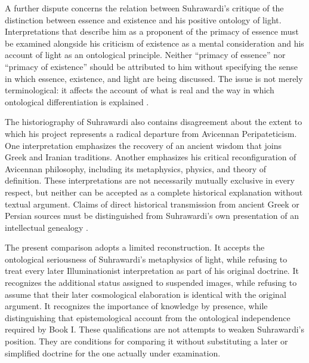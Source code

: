 \label{para:VS.B01.P01.C08.S14.SS03.P002}

A further dispute concerns the relation between Suhrawardi's
critique of the distinction between essence and existence
and his positive ontology of light. Interpretations that
describe him as a proponent of the primacy of essence must
be examined alongside his criticism of existence as a
mental consideration and his account of light as an
ontological principle. Neither ``primacy of essence'' nor
``primacy of existence'' should be attributed to him without
specifying the sense in which essence, existence, and light
are being discussed. The issue is not merely terminological:
it affects the account of what is real and the way in which
ontological differentiation is explained
\citep{MarcotteSuhrawardiSEP2019,WalbridgeLeavenAncients2000}.

\label{para:VS.B01.P01.C08.S14.SS03.P003}

The historiography of Suhrawardi also contains disagreement
about the extent to which his project represents a radical
departure from Avicennan Peripateticism. One interpretation
emphasizes the recovery of an ancient wisdom that joins Greek
and Iranian traditions. Another emphasizes his critical
reconfiguration of Avicennan philosophy, including its
metaphysics, physics, and theory of definition. These
interpretations are not necessarily mutually exclusive in
every respect, but neither can be accepted as a complete
historical explanation without textual argument. Claims of
direct historical transmission from ancient Greek or Persian
sources must be distinguished from Suhrawardi's own
presentation of an intellectual genealogy
\citep{WalbridgeLeavenAncients2000,ZiaiKnowledgeIllumination1990}.

\label{para:VS.B01.P01.C08.S14.SS03.P004}

The present comparison adopts a limited reconstruction.
It accepts the ontological seriousness of Suhrawardi's
metaphysics of light, while refusing to treat every later
Illuminationist interpretation as part of his original
doctrine. It recognizes the additional status assigned to
suspended images, while refusing to assume that their later
cosmological elaboration is identical with the original
argument. It recognizes the importance of knowledge by
presence, while distinguishing that epistemological account
from the ontological independence required by Book I.
These qualifications are not attempts to weaken Suhrawardi's
position. They are conditions for comparing it without
substituting a later or simplified doctrine for the one
actually under examination.

